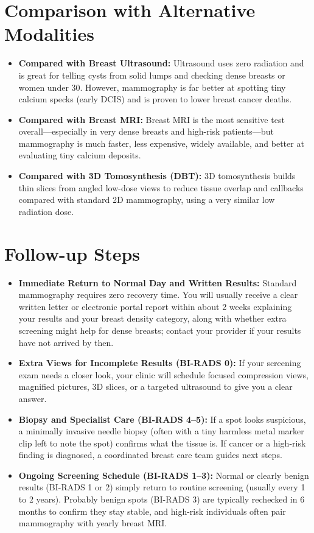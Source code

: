 \section{Comparison with Alternative Modalities}

\begin{itemize}
    \item \textbf{Compared with Breast Ultrasound:} Ultrasound uses zero radiation and is great for telling cysts from solid lumps and checking dense breasts or women under 30. However, mammography is far better at spotting tiny calcium specks (early DCIS) and is proven to lower breast cancer deaths.
    \item \textbf{Compared with Breast MRI:} Breast MRI is the most sensitive test overall---especially in very dense breasts and high-risk patients---but mammography is much faster, less expensive, widely available, and better at evaluating tiny calcium deposits.
    \item \textbf{Compared with 3D Tomosynthesis (DBT):} 3D tomosynthesis builds thin slices from angled low-dose views to reduce tissue overlap and callbacks compared with standard 2D mammography, using a very similar low radiation dose.
\end{itemize}

\section{Follow-up Steps}

\begin{itemize}
    \item \textbf{Immediate Return to Normal Day and Written Results:} Standard mammography requires zero recovery time. You will usually receive a clear written letter or electronic portal report within about 2 weeks explaining your results and your breast density category, along with whether extra screening might help for dense breasts; contact your provider if your results have not arrived by then.
    \item \textbf{Extra Views for Incomplete Results (BI-RADS 0):} If your screening exam needs a closer look, your clinic will schedule focused compression views, magnified pictures, 3D slices, or a targeted ultrasound to give you a clear answer.
    \item \textbf{Biopsy and Specialist Care (BI-RADS 4--5):} If a spot looks suspicious, a minimally invasive needle biopsy (often with a tiny harmless metal marker clip left to note the spot) confirms what the tissue is. If cancer or a high-risk finding is diagnosed, a coordinated breast care team guides next steps.
    \item \textbf{Ongoing Screening Schedule (BI-RADS 1--3):} Normal or clearly benign results (BI-RADS 1 or 2) simply return to routine screening (usually every 1 to 2 years). Probably benign spots (BI-RADS 3) are typically rechecked in 6 months to confirm they stay stable, and high-risk individuals often pair mammography with yearly breast MRI.
\end{itemize}


